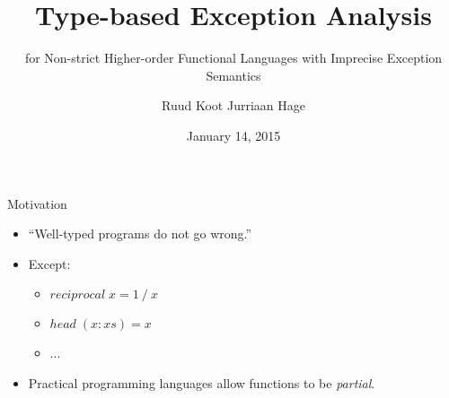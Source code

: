 \documentclass[serif,professionalfont]{beamer}
\newcommand{\Varid}[1]{\mathit{#1}}
\theoremstyle{plain}
\theoremstyle{definition}
\begin{document}
\title{Type-based Exception Analysis}
\subtitle{for Non-strict Higher-order Functional Languages with Imprecise Exception Semantics}
\author{Ruud Koot \quad Jurriaan Hage}
\date{January 14, 2015}
\maketitle

\begin{frame}{Motivation}

    \begin{itemize}

        \item ``Well-typed programs do not go wrong.''
        
        \pause
        
        \item Except:
        
            \begin{itemize}
            
                \item \ensuremath{\Varid{reciprocal}\;\Varid{x}\mathrel{=}\mathrm{1}\mathbin{/}\Varid{x}}

                \item \ensuremath{\Varid{head}\;(\Varid{x}\mathbin{:}\Varid{xs})\mathrel{=}\Varid{x}}

                \item ...

            \end{itemize}
            
        \item Practical programming languages allow functions to be \emph{partial}.

    \end{itemize}
    
\end{frame}
\end{document}
